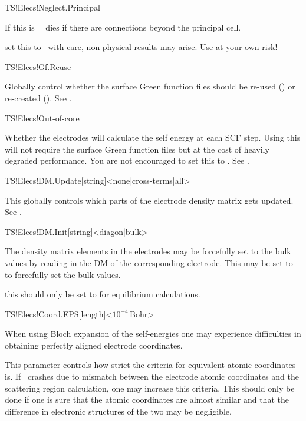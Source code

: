 \begin{fdflogicalF}{TS!Elecs!Neglect.Principal}
  
  If this is \fdffalse\ \tsiesta\ dies if there are connections beyond
  the principal cell.

  \note set this to \fdftrue\ with care, non-physical results may
  arise. Use at your own risk!

\end{fdflogicalF}  

\begin{fdflogicalT}{TS!Elecs!Gf.Reuse}
  
  Globally control whether the surface Green function files should
  be re-used (\fdftrue) or re-created (\fdffalse).
  See .
  
\end{fdflogicalT}

\begin{fdflogicalT}{TS!Elecs!Out-of-core}

  Whether the electrodes will calculate the self energy at each SCF
  step. Using this will not require the surface Green function files
  but at the cost of heavily degraded performance.
  You are not encouraged to set this to \fdffalse.
  See .
  
\end{fdflogicalT}

\begin{fdfentry}{TS!Elecs!DM.Update}[string]<none|cross-terms|all>

  This globally controls which parts of the electrode density matrix
  gets updated. 
  See .
  
\end{fdfentry}

\begin{fdfentry}{TS!Elecs!DM.Init}[string]<diagon|bulk>

  The density matrix elements in the electrodes may be forcefully set
  to the bulk values by reading in the DM of the corresponding
  electrode. This may be set to  to forcefully set the bulk
  values.

  \note this should only be set to  for equilibrium
  calculations. 
  
\end{fdfentry}

\begin{fdfentry}{TS!Elecs!Coord.EPS}[length]<$10^{-4}\,\mathrm{Bohr}$>

  When using Bloch expansion of the self-energies one may experience
  difficulties in obtaining perfectly aligned electrode coordinates.

  This parameter controls how strict the criteria for equivalent
  atomic coordinates is. If \tsiesta\ crashes due to mismatch between
  the electrode atomic coordinates and the scattering region
  calculation, one may increase this criteria. This should only be
  done if one is sure that the atomic coordinates are almost similar
  and that the difference in electronic structures of the two may be
  negligible.
  
\end{fdfentry}


